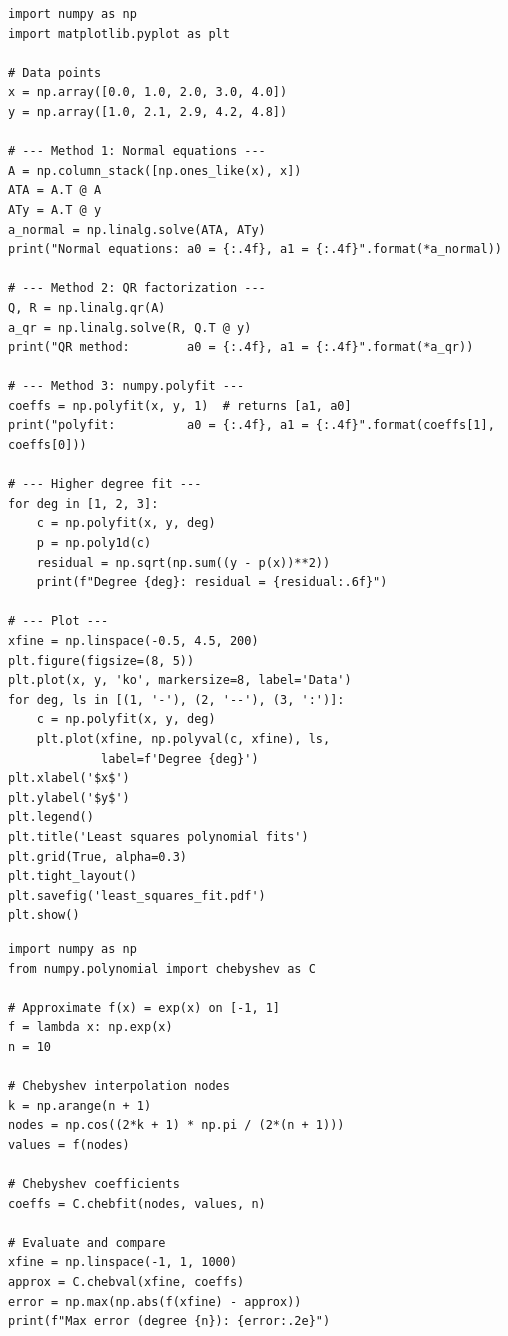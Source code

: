 \begin{codeblock}[title=\textbf{Python --- Least squares via normal equations and \texttt{polyfit}}]
\begin{verbatim}
import numpy as np
import matplotlib.pyplot as plt

# Data points
x = np.array([0.0, 1.0, 2.0, 3.0, 4.0])
y = np.array([1.0, 2.1, 2.9, 4.2, 4.8])

# --- Method 1: Normal equations ---
A = np.column_stack([np.ones_like(x), x])
ATA = A.T @ A
ATy = A.T @ y
a_normal = np.linalg.solve(ATA, ATy)
print("Normal equations: a0 = {:.4f}, a1 = {:.4f}".format(*a_normal))

# --- Method 2: QR factorization ---
Q, R = np.linalg.qr(A)
a_qr = np.linalg.solve(R, Q.T @ y)
print("QR method:        a0 = {:.4f}, a1 = {:.4f}".format(*a_qr))

# --- Method 3: numpy.polyfit ---
coeffs = np.polyfit(x, y, 1)  # returns [a1, a0]
print("polyfit:          a0 = {:.4f}, a1 = {:.4f}".format(coeffs[1], coeffs[0]))

# --- Higher degree fit ---
for deg in [1, 2, 3]:
    c = np.polyfit(x, y, deg)
    p = np.poly1d(c)
    residual = np.sqrt(np.sum((y - p(x))**2))
    print(f"Degree {deg}: residual = {residual:.6f}")

# --- Plot ---
xfine = np.linspace(-0.5, 4.5, 200)
plt.figure(figsize=(8, 5))
plt.plot(x, y, 'ko', markersize=8, label='Data')
for deg, ls in [(1, '-'), (2, '--'), (3, ':')]:
    c = np.polyfit(x, y, deg)
    plt.plot(xfine, np.polyval(c, xfine), ls,
             label=f'Degree {deg}')
plt.xlabel('$x$')
plt.ylabel('$y$')
plt.legend()
plt.title('Least squares polynomial fits')
plt.grid(True, alpha=0.3)
plt.tight_layout()
plt.savefig('least_squares_fit.pdf')
plt.show()
\end{verbatim}
\end{codeblock}

\begin{codeblock}[title=\textbf{Python --- Chebyshev approximation}]
\begin{verbatim}
import numpy as np
from numpy.polynomial import chebyshev as C

# Approximate f(x) = exp(x) on [-1, 1]
f = lambda x: np.exp(x)
n = 10

# Chebyshev interpolation nodes
k = np.arange(n + 1)
nodes = np.cos((2*k + 1) * np.pi / (2*(n + 1)))
values = f(nodes)

# Chebyshev coefficients
coeffs = C.chebfit(nodes, values, n)

# Evaluate and compare
xfine = np.linspace(-1, 1, 1000)
approx = C.chebval(xfine, coeffs)
error = np.max(np.abs(f(xfine) - approx))
print(f"Max error (degree {n}): {error:.2e}")
\end{verbatim}
\end{codeblock}

